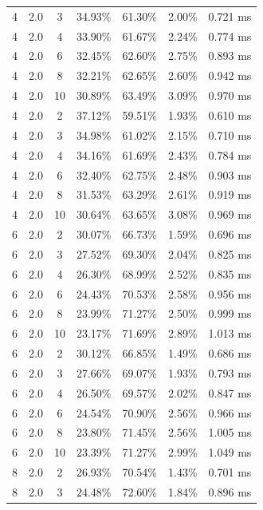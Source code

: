 \documentclass[11pt,a4paper]{article}
\begin{document}
\begin{longtable}{ccccccc}
        4 & 2.0 & 3 & 34.93\% & 61.30\% & 2.00\% & 0.721 ms \\
        4 & 2.0 & 4 & 33.90\% & 61.67\% & 2.24\% & 0.774 ms \\
        4 & 2.0 & 6 & 32.45\% & 62.60\% & 2.75\% & 0.893 ms \\
        4 & 2.0 & 8 & 32.21\% & 62.65\% & 2.60\% & 0.942 ms \\
        4 & 2.0 & 10 & 30.89\% & 63.49\% & 3.09\% & 0.970 ms \\
        4 & 2.0 & 2 & 37.12\% & 59.51\% & 1.93\% & 0.610 ms \\
        4 & 2.0 & 3 & 34.98\% & 61.02\% & 2.15\% & 0.710 ms \\
        4 & 2.0 & 4 & 34.16\% & 61.69\% & 2.43\% & 0.784 ms \\
        4 & 2.0 & 6 & 32.40\% & 62.75\% & 2.48\% & 0.903 ms \\
        4 & 2.0 & 8 & 31.53\% & 63.29\% & 2.61\% & 0.919 ms \\
        4 & 2.0 & 10 & 30.64\% & 63.65\% & 3.08\% & 0.969 ms \\
        \midrule
        6 & 2.0 & 2 & 30.07\% & 66.73\% & 1.59\% & 0.696 ms \\
        6 & 2.0 & 3 & 27.52\% & 69.30\% & 2.04\% & 0.825 ms \\
        6 & 2.0 & 4 & 26.30\% & 68.99\% & 2.52\% & 0.835 ms \\
        6 & 2.0 & 6 & 24.43\% & 70.53\% & 2.58\% & 0.956 ms \\
        6 & 2.0 & 8 & 23.99\% & 71.27\% & 2.50\% & 0.999 ms \\
        6 & 2.0 & 10 & 23.17\% & 71.69\% & 2.89\% & 1.013 ms \\
        6 & 2.0 & 2 & 30.12\% & 66.85\% & 1.49\% & 0.686 ms \\
        6 & 2.0 & 3 & 27.66\% & 69.07\% & 1.93\% & 0.793 ms \\
        6 & 2.0 & 4 & 26.50\% & 69.57\% & 2.02\% & 0.847 ms \\
        6 & 2.0 & 6 & 24.54\% & 70.90\% & 2.56\% & 0.966 ms \\
        6 & 2.0 & 8 & 23.80\% & 71.45\% & 2.56\% & 1.005 ms \\
        6 & 2.0 & 10 & 23.39\% & 71.27\% & 2.99\% & 1.049 ms \\
        \midrule
        8 & 2.0 & 2 & 26.93\% & 70.54\% & 1.43\% & 0.701 ms \\
        8 & 2.0 & 3 & 24.48\% & 72.60\% & 1.84\% & 0.896 ms \\

\end{longtable}
\end{document}
